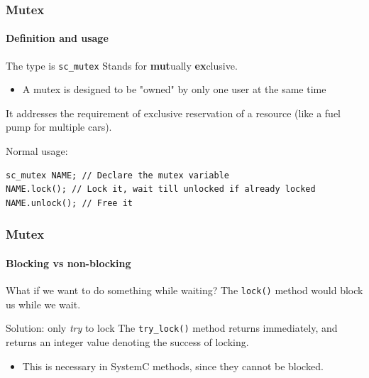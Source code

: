 \begin{frame}[fragile]
\frametitle{Mutex}
\framesubtitle{Definition and usage}
\begin{block}{The type is \texttt{sc\_mutex}}
Stands for {\bfseries mut}ually {\bfseries ex}clusive.
\begin{itemize}
\item A mutex is designed to be "owned" by only one user at the same time
\end{itemize}
It addresses the requirement of exclusive reservation of a resource (like a fuel pump for multiple cars).
\end{block}
\pause
\begin{block}{Normal usage:}
\vspace{-1em}
{\scriptsize 
\begin{verbatim}
sc_mutex NAME; // Declare the mutex variable
NAME.lock(); // Lock it, wait till unlocked if already locked
NAME.unlock(); // Free it
\end{verbatim}
}
\vspace{-1em}
\end{block}
\end{frame}

\begin{frame}[fragile]
\frametitle{Mutex}
\framesubtitle{Blocking vs non-blocking}
\begin{block}{What if we want to do something while waiting?}
The \texttt{lock()} method would block us while we wait.
\end{block}
\pause
\begin{block}{Solution: only {\em try} to lock}
The \texttt{try\_lock()} method returns immediately, and returns an integer value denoting the success of locking.
\begin{itemize}
\item This is necessary in SystemC methods, since they cannot be blocked.
\end{itemize}
\end{block}
\end{frame}

